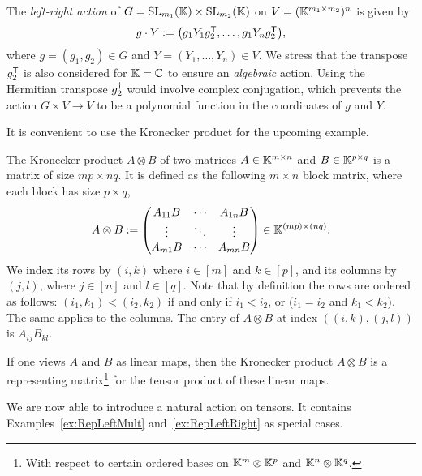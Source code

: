 \begin{example} \label{ex:RepLeftRight}
	The \emph{left-right action} of $G = \operatorname{SL}_{m_1}(\mathbb K) \times \operatorname{SL}_{m_2}(\mathbb K)$ on $V = (\mathbb K^{m_1 \times m_2})^n$ is given by 
		\[ g \cdot Y := \big( g_1 Y_1 g_2^{\mathsf{T}}, \ldots, g_1 Y_n g_2^{\mathsf{T}} \big), \]
	where $g = (g_1,g_2) \in G$ and $Y = (Y_1,\ldots,Y_n) \in V$. We stress that the transpose $g_2^{\mathsf{T}}$ is also considered for $\mathbb K = \mathbb C$ to ensure an \emph{algebraic} action. Using the Hermitian transpose $g_2^{\dagger}$ would involve complex conjugation, which prevents the action $G \times V \to V$ to be a polynomial function in the coordinates of $g$ and $Y$.
	\hfill\exSymbol
\end{example}

It is convenient to use the Kronecker product for the upcoming example.

\begin{defn} \label{defn:KroneckerProduct}	
	The Kronecker product $A \otimes B$ of two matrices $A \in \mathbb K^{m \times n}$ and $B \in \mathbb K^{p \times q}$ is a matrix of size $m p \times n q$. It is defined as the following $m \times n$ block matrix, where each block has size $p \times q$,
	\begin{align*}
		A \otimes B := \begin{pmatrix}
			A_{11} B & \cdots & A_{1n}B \\
			\vdots & \ddots & \vdots \\
			A_{m1} B & \cdots & A_{mn}B
		\end{pmatrix} \in \mathbb K^{(mp)\times(nq)}.
	\end{align*} 
	We index its rows by $(i,k)$ where $i \in [m]$ and $k \in [p]$, and its columns by $(j,l)$, where $j \in [n]$ and $l \in [q]$. Note that by definition the rows are ordered as follows: $(i_1,k_1) < (i_2,k_2)$ if and only if $i_1 < i_2$, or ($i_1 = i_2$ and $k_1 < k_2$). The same applies to the columns.
	The entry of $A \otimes B$ at index $((i,k),(j,l))$ is $A_{ij} B_{kl}$.
	
	If one views $A$ and $B$ as linear maps, then the Kronecker product $A \otimes B$ is a representing matrix\footnote{With respect to certain ordered bases on $\mathbb K^{m} \otimes \mathbb K^{p}$ and $\mathbb K^{n} \otimes \mathbb K^q$.} for the tensor product of these linear maps.
	\hfill{}
\end{defn}

We are now able to introduce a natural action on tensors. It contains Examples~\ref{ex:RepLeftMult} and~\ref{ex:RepLeftRight} as special cases.

